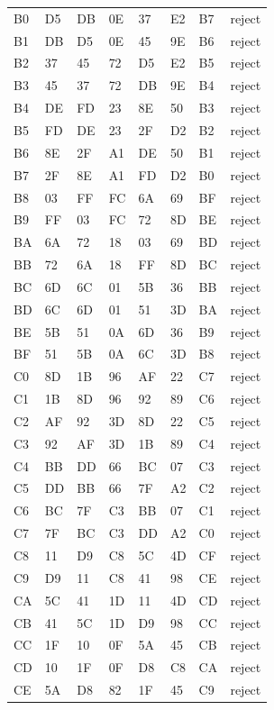 \begin{longtable}{llllllll}
B0 & D5 & DB & 0E & 37 & E2 & B7 & reject\\
B1 & DB & D5 & 0E & 45 & 9E & B6 & reject\\
B2 & 37 & 45 & 72 & D5 & E2 & B5 & reject\\
B3 & 45 & 37 & 72 & DB & 9E & B4 & reject\\
B4 & DE & FD & 23 & 8E & 50 & B3 & reject\\
B5 & FD & DE & 23 & 2F & D2 & B2 & reject\\
B6 & 8E & 2F & A1 & DE & 50 & B1 & reject\\
B7 & 2F & 8E & A1 & FD & D2 & B0 & reject\\
B8 & 03 & FF & FC & 6A & 69 & BF & reject\\
B9 & FF & 03 & FC & 72 & 8D & BE & reject\\
BA & 6A & 72 & 18 & 03 & 69 & BD & reject\\
BB & 72 & 6A & 18 & FF & 8D & BC & reject\\
BC & 6D & 6C & 01 & 5B & 36 & BB & reject\\
BD & 6C & 6D & 01 & 51 & 3D & BA & reject\\
BE & 5B & 51 & 0A & 6D & 36 & B9 & reject\\
BF & 51 & 5B & 0A & 6C & 3D & B8 & reject\\
C0 & 8D & 1B & 96 & AF & 22 & C7 & reject\\
C1 & 1B & 8D & 96 & 92 & 89 & C6 & reject\\
C2 & AF & 92 & 3D & 8D & 22 & C5 & reject\\
C3 & 92 & AF & 3D & 1B & 89 & C4 & reject\\
C4 & BB & DD & 66 & BC & 07 & C3 & reject\\
C5 & DD & BB & 66 & 7F & A2 & C2 & reject\\
C6 & BC & 7F & C3 & BB & 07 & C1 & reject\\
C7 & 7F & BC & C3 & DD & A2 & C0 & reject\\
C8 & 11 & D9 & C8 & 5C & 4D & CF & reject\\
C9 & D9 & 11 & C8 & 41 & 98 & CE & reject\\
CA & 5C & 41 & 1D & 11 & 4D & CD & reject\\
CB & 41 & 5C & 1D & D9 & 98 & CC & reject\\
CC & 1F & 10 & 0F & 5A & 45 & CB & reject\\
CD & 10 & 1F & 0F & D8 & C8 & CA & reject\\
CE & 5A & D8 & 82 & 1F & 45 & C9 & reject\\

\end{longtable}
